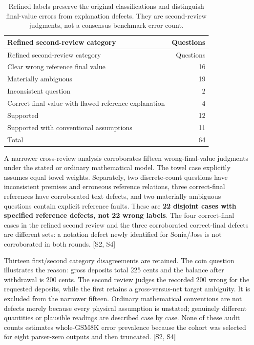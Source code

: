 \documentclass[12pt,a4paper]{report}
\begin{document}
\begin{longtable}[]{@{}lr@{}}
\caption{Refined labels preserve the original classifications and
distinguish final-value errors from explanation defects. They are
second-review judgments, not a consensus benchmark error
count.}\tabularnewline
\toprule\noalign{}
Refined second-review category & Questions \\
\midrule\noalign{}
\endfirsthead
\toprule\noalign{}
Refined second-review category & Questions \\
\midrule\noalign{}
\endhead
\bottomrule\noalign{}
\endlastfoot
Clear wrong reference final value & 16 \\
Materially ambiguous & 19 \\
Inconsistent question & 2 \\
Correct final value with flawed reference explanation & 4 \\
Supported & 12 \\
Supported with conventional assumptions & 11 \\
Total & 64 \\
\end{longtable}

A narrower cross-review analysis corroborates fifteen wrong-final-value
judgments under the stated or ordinary mathematical model. The towel
case explicitly assumes equal towel weights. Separately, two
discrete-count questions have inconsistent premises and erroneous
reference relations, three correct-final references have corroborated
text defects, and two materially ambiguous questions contain explicit
reference faults. These are \textbf{22 disjoint cases with specified
reference defects, not 22 wrong labels}. The four correct-final cases in
the refined second review and the three corroborated correct-final
defects are different sets: a notation defect newly identified for
Sonia/Joss is not corroborated in both rounds. {[}S2, S4{]}

Thirteen first/second category disagreements are retained. The coin
question illustrates the reason: gross deposits total 225 cents and the
balance after withdrawal is 200 cents. The second review judges the
recorded 200 wrong for the requested deposits, while the first retains a
gross-versus-net target ambiguity. It is excluded from the narrower
fifteen. Ordinary mathematical conventions are not defects merely
because every physical assumption is unstated; genuinely different
quantities or plausible readings are described case by case. None of
these audit counts estimates whole-GSM8K error prevalence because the
cohort was selected for eight parser-zero outputs and then truncated.
{[}S2, S4{]}
\end{document}
